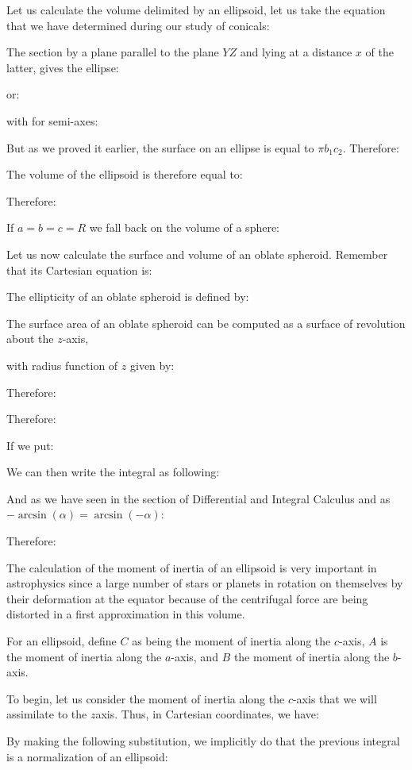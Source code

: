 {	Let us calculate the volume delimited by an ellipsoid, let us take the equation that we have determined during our study of conicals:
	
	The section by a plane parallel to the plane $YZ$ and lying at a distance $x$ of the latter, gives the ellipse:
	
	or:
	
	with for semi-axes:
	
	But as we proved it earlier, the surface on an ellipse is equal to $\pi b_1c_2$. Therefore:
	
	The volume of the ellipsoid is therefore equal to:
	
	Therefore:
	
	If $a=b=c=R$ we fall back on the volume of a sphere:
	
	
	Let us now calculate the surface and volume of an oblate spheroid. Remember that its Cartesian equation is:
	
	The ellipticity of an oblate spheroid is defined by:
	
	The surface area of an oblate spheroid can be computed as a surface of revolution about the $z$-axis,
	
	with radius function of $z$ given by:
	
	Therefore:
	
	Therefore:
	
	If we put:
	
	We can then write the integral as following:
	
	And as we have seen in the section of Differential and Integral Calculus and as $-\arcsin(\alpha)=\arcsin(-\alpha)$:
	
	Therefore:
	
	The calculation of the moment of inertia of an ellipsoid is very important in astrophysics since a large number of stars or planets in rotation on themselves by their deformation at the equator because of the centrifugal force are being distorted in a first approximation in this volume.
	
	For an ellipsoid, define $C$ as being the moment of inertia along the $c$-axis, $A$ is the moment of inertia along the $a$-axis, and $B$ the moment of inertia along the $b$-axis.

	To begin, let us consider the moment of inertia along the $c$-axis that we will assimilate to the $z$axis. Thus, in Cartesian coordinates, we have:
	
	By making the following substitution, we implicitly do that the previous integral is a normalization of an ellipsoid:
	
}
